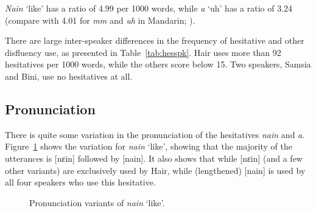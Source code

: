 \documentclass[output=paper,colorlinks,citecolor=brown
\ChapterDOI{10.5281/zenodo.15697587}
]{langscibook}
\begin{document}
\textit{Nain} `like' has a ratio of 4.99 per 1000 words, while \textit{a} `uh' has a ratio of 3.24 (compare with 4.01 for \textit{mm} and \textit{uh} in Mandarin; \citealt{zhao2005}).

There are large inter-speaker differences in the frequency of hesitative and other disfluency use, as presented in Table~\ref{tab:hesspk}. Hair uses more than 92 hesitatives per 1000 words, while the others score below 15. Two speakers, Samsia and Bini, use no hesitatives at all.

\subsection{Pronunciation}
There is quite some variation in the pronunciation of the hesitatives \textit{nain} and \textit{a}. Figure~\ref{fig:hesnainpron} shows the variation for \textit{nain} `like', showing that the majority of the utterances is [nɛin] followed by [nain]. It also shows that while [nɛin] (and a few other variants) are exclusively used by Hair, while (lengthened) [nain] is used by all four speakers who use this hesitative.

\begin{figure}[ht]
	\small
{}
	\caption{Pronunciation variants of \textit{nain} `like'.}\label{fig:hesnainpron}
\end{figure}
\end{document}
